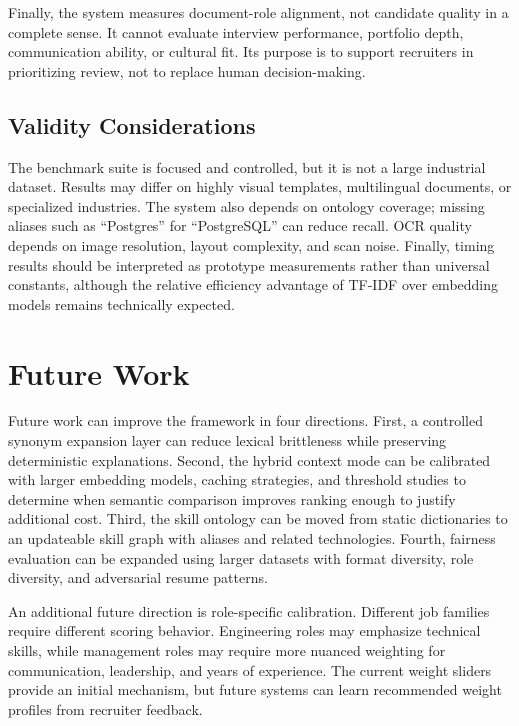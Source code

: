Finally, the system measures document-role alignment, not candidate quality in a complete sense. It cannot evaluate interview performance, portfolio depth, communication ability, or cultural fit. Its purpose is to support recruiters in prioritizing review, not to replace human decision-making.

\subsection{Validity Considerations}
The benchmark suite is focused and controlled, but it is not a large industrial dataset. Results may differ on highly visual templates, multilingual documents, or specialized industries. The system also depends on ontology coverage; missing aliases such as ``Postgres'' for ``PostgreSQL'' can reduce recall. OCR quality depends on image resolution, layout complexity, and scan noise. Finally, timing results should be interpreted as prototype measurements rather than universal constants, although the relative efficiency advantage of TF-IDF over embedding models remains technically expected.

\section{Future Work}
Future work can improve the framework in four directions. First, a controlled synonym expansion layer can reduce lexical brittleness while preserving deterministic explanations. Second, the hybrid context mode can be calibrated with larger embedding models, caching strategies, and threshold studies to determine when semantic comparison improves ranking enough to justify additional cost. Third, the skill ontology can be moved from static dictionaries to an updateable skill graph with aliases and related technologies. Fourth, fairness evaluation can be expanded using larger datasets with format diversity, role diversity, and adversarial resume patterns.

An additional future direction is role-specific calibration. Different job families require different scoring behavior. Engineering roles may emphasize technical skills, while management roles may require more nuanced weighting for communication, leadership, and years of experience. The current weight sliders provide an initial mechanism, but future systems can learn recommended weight profiles from recruiter feedback.

